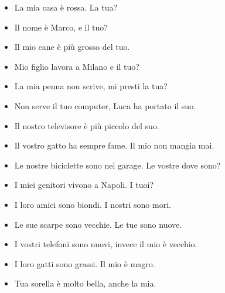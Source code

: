 \documentclass[letter,11pt]{article}
\begin{document}
\vskip 0.5in
\begin{multicols}{2}
\begin{itemize}
    \item La mia casa è rossa. La tua?
    \item Il nome è Marco, e il tuo?
    \item Il mio cane è più grosso del tuo.
    \item Mio figlio lavora a Milano e il tuo?
    \item La mia penna non scrive, mi presti la tua?
    \item Non serve il tuo computer, Luca ha portato il suo.
    \item Il nostro televisore è più piccolo del suo.
    \item Il vostro gatto ha sempre fame. Il mio non mangia mai.
    \item Le nostre biciclette sono nel garage. Le vostre dove sono?
    \item I miei genitori vivono a Napoli. I tuoi?
    \item I loro amici sono biondi. I nostri sono mori.
    \item Le sue scarpe sono vecchie. Le tue sono nuove.
    \item I vostri telefoni sono nuovi, invece il mio è vecchio.
    \item I loro gatti sono grassi. Il mio è magro.
    \item Tua sorella è molto bella, anche la mia.


\end{itemize}
\end{multicols}
\end{document}
